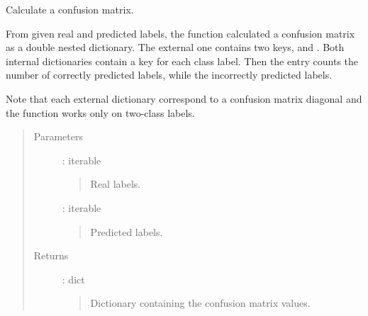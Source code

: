 \documentclass[letterpaper,10pt,english]{sphinxmanual}
\begin{document}

\begin{fulllineitems}
\label{\detokenize{api:palladio.utils.confusion_matrix}}
Calculate a confusion matrix.

From given real and predicted labels, the function calculated
a confusion matrix as a double nested dictionary.
The external one contains two keys,  and .
Both internal dictionaries
contain a key for each class label. Then the \sphinxcode{{[}'T'{]}{[}'C1'{]}} entry counts
the number of correctly predicted  labels,
while \sphinxcode{{[}'F'{]}{[}'C2'{]}} the incorrectly predicted  labels.

Note that each external dictionary correspond to a confusion
matrix diagonal and the function works only on two-class labels.
\begin{quote}\begin{description}
\item[{Parameters}] \leavevmode
{} : iterable
\begin{quote}

Real labels.
\end{quote}

 : iterable
\begin{quote}

Predicted labels.
\end{quote}

\item[{Returns}] \leavevmode
{} : dict
\begin{quote}

Dictionary containing the confusion matrix values.
\end{quote}

\end{description}\end{quote}

\end{fulllineitems}

\end{document}
